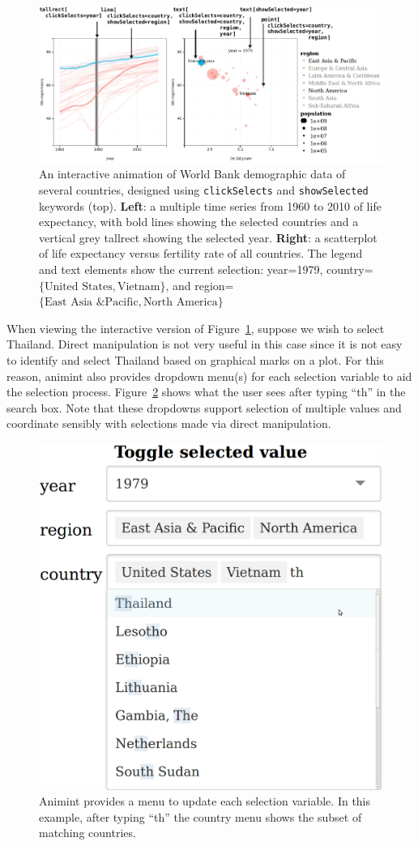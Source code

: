 \documentclass[12pt]{article}\usepackage[]{graphicx}\usepackage[]{color}
\begin{document}
\begin{figure}[htp]
  \centering
  \includegraphics[width=\textwidth]{figure-1}
  \caption{An interactive animation of World Bank demographic data of
    several countries, designed using \texttt{clickSelects} and
    \texttt{showSelected} keywords (top).  \textbf{Left}: a multiple
    time series from 1960 to 2010 of life expectancy, with bold lines
    showing the selected countries and a vertical grey tallrect
    showing the selected year. \textbf{Right}: a scatterplot of life
    expectancy versus fertility rate of all countries. The legend and
    text elements show the current selection: year=1979,
    country=$\{\textrm{United States}, \textrm{Vietnam}\}$, and
    region=$\{\textrm{East Asia \& Pacific}, \textrm{North
      America}\}$}
  \label{fig:worldbank}
\end{figure}

When viewing the interactive version of Figure~\ref{fig:worldbank}, suppose
we wish to select Thailand. Direct manipulation is not very useful in 
this case since it is not easy to identify and select Thailand based
on graphical marks on a plot. For this reason, animint also provides 
dropdown menu(s) for each selection variable to aid the selection process.
Figure~\ref{fig:widgets} shows what the user sees after typing ``th'' in 
the search box. Note that these dropdowns support selection of multiple
values and coordinate sensibly with selections made via direct manipulation.

\begin{figure}[htp]
  \centering
  \includegraphics[width=0.5\columnwidth]{Screenshot-toggle-selected-value}
  \caption{Animint provides a menu to update each selection
    variable. In this example, after typing ``th'' the country menu
    shows the subset of matching countries.}
  \label{fig:widgets}
\end{figure}
\end{document}

